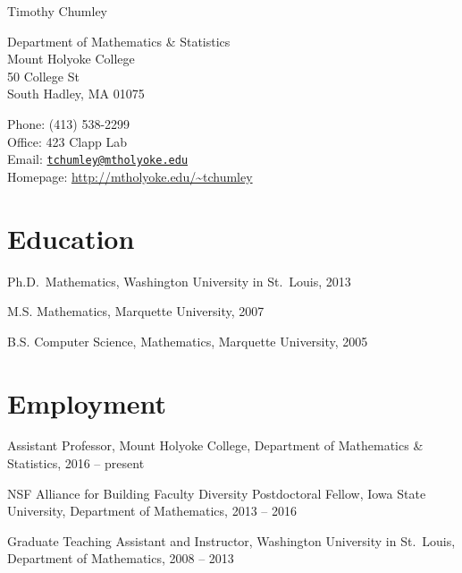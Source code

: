 \documentclass[10pt,letterpaper]{article}
\def\name{Timothy Chumley}
\renewenvironment{itemize}{
  \begin{list}{}{
    \setlength{\leftmargin}{1.5em}
    \setlength{\itemsep}{0.25em}
    \setlength{\parskip}{0pt}
    \setlength{\parsep}{0.25em}
  }
}{
  \end{list}
}
\providecommand{\tightlist}{%
  \setlength{\itemsep}{0pt}\setlength{\parskip}{0pt}}
\let\tightlist\relax
\begin{document}
{\huge \name}


\bigskip

\begin{minipage}[t]{0.495\textwidth}
  Department of Mathematics \& Statistics \\
  Mount Holyoke College \\
  50 College St \\
  South Hadley, MA 01075
\end{minipage}
\begin{minipage}[t]{0.495\textwidth}
  Phone: (413) 538-2299 \\
  Office: 423 Clapp Lab \\
  Email: \href{mailto:tchumley@mtholyoke.edu}{\tt tchumley@mtholyoke.edu} \\
  Homepage: \url{http://mtholyoke.edu/~tchumley}
\end{minipage}

\hypertarget{education}{%
\section*{Education}\label{education}}

\begin{itemize}
\tightlist
\item
  Ph.D.~Mathematics, Washington University in St.~Louis, 2013
\item
  M.S. Mathematics, Marquette University, 2007
\item
  B.S. Computer Science, Mathematics, Marquette University, 2005
\end{itemize}

\hypertarget{employment}{%
\section*{Employment}\label{employment}}

\begin{itemize}
\tightlist
\item
  Assistant Professor, Mount Holyoke College, Department of Mathematics
  \& Statistics, 2016 -- present
\item
  NSF Alliance for Building Faculty Diversity Postdoctoral Fellow, Iowa
  State University, Department of Mathematics, 2013 -- 2016
\item
  Graduate Teaching Assistant and Instructor, Washington University in
  St.~Louis, Department of Mathematics, 2008 -- 2013
\end{itemize}
\end{document}
